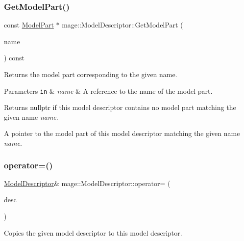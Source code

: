 \subsubsection{\texorpdfstring{Get\+Model\+Part()}{GetModelPart()}}
{\footnotesize\ttfamily const \hyperlink{structmage_1_1_model_part}{Model\+Part} $\ast$ mage\+::\+Model\+Descriptor\+::\+Get\+Model\+Part (\begin{DoxyParamCaption}\item[{const string \&}]{name }\end{DoxyParamCaption}) const\hspace{0.3cm}{\ttfamily [noexcept]}}

Returns the model part corresponding to the given name.


\begin{DoxyParams}[1]{Parameters}
\mbox{\tt in}  & {\em name} & A reference to the name of the model part. \\
\hline
\end{DoxyParams}
\begin{DoxyReturn}{Returns}
{\ttfamily nullptr} if this model descriptor contains no model part matching the given name {\itshape name}. 

A pointer to the model part of this model descriptor matching the given name {\itshape name}. 
\end{DoxyReturn}
\hypertarget{classmage_1_1_model_descriptor_a734b17224719896921e9f6252ee88483}{}\label{classmage_1_1_model_descriptor_a734b17224719896921e9f6252ee88483} 
\subsubsection{\texorpdfstring{operator=()}{operator=()}\hspace{0.1cm}{\footnotesize\ttfamily [1/2]}}
{\footnotesize\ttfamily \hyperlink{classmage_1_1_model_descriptor}{Model\+Descriptor}\& mage\+::\+Model\+Descriptor\+::operator= (\begin{DoxyParamCaption}\item[{const \hyperlink{classmage_1_1_model_descriptor}{Model\+Descriptor} \&}]{desc }\end{DoxyParamCaption})\hspace{0.3cm}{\ttfamily [delete]}}

Copies the given model descriptor to this model descriptor.


